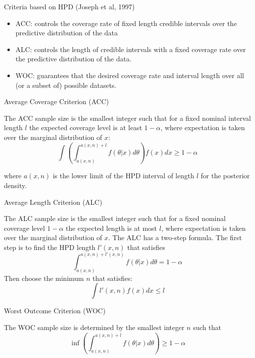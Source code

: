 \documentclass{beamer}
\begin{document}
\begin{frame}{Criteria based on HPD (Joseph et al, 1997)}

\begin{itemize}
\itemsep1pt\parskip0pt
\item
  ACC: controls the coverage rate of fixed length credible intervals
  over the predictive distribution of the data
\item
  ALC: controls the length of credible intervals with a fixed coverage
  rate over the predictive distribution of the data.
\item
  WOC: guarantees that the desired coverage rate and interval length
  over all (or a subset of) possible datasets.
\end{itemize}

\end{frame}




\begin{frame}{Average Coverage Criterion (ACC)}

The ACC sample size is the smallest integer such that for a fixed
nominal interval length \(l\) the expected coverage level is at least
\(1 - \alpha\), where expectation is taken over the marginal
distribution of \(x\): \[
\int \left(\int_{a\left(x,n\right)}^{a\left(x,n\right)+l} f\left(\theta\vert x\right) d\theta\right) f\left(x\right) dx \ge 1-\alpha 
\]

where \(a\left(x,n\right)\) is the lower limit of the HPD interval of
length \(l\) for the posterior density.

\end{frame}


\begin{frame}{Average Length Criterion (ALC)}

The ALC sample size is the smallest integer such that for a fixed
nominal coverage level \(1 - \alpha\) the expected length is at most
\(l\), where expectation is taken over the marginal distribution of
\(x\). The ALC has a two-step formula. The first step is to find the HPD
length \(l'\left(x,n\right)\) that satisfies \[
\int_{a\left(x,n\right)}^{a\left(x,n\right)+l'\left(x,n\right)} f\left(\theta\vert x\right) d\theta=1-\alpha
\] Then choose the minimum \(n\) that satisfies: \[
\int  l'\left(x,n\right) f\left(x\right) dx \le l
\]

\end{frame}




\begin{frame}{Worst Outcome Criterion (WOC)}

The WOC sample size is determined by the smallest integer \(n\) such
that \[
\inf \left(\int_{a\left(x,n\right)}^{a\left(x,n\right)+l} f\left(\theta\vert x\right) d\theta\right) \ge 1-\alpha 
\]

\end{frame}
\end{document}
